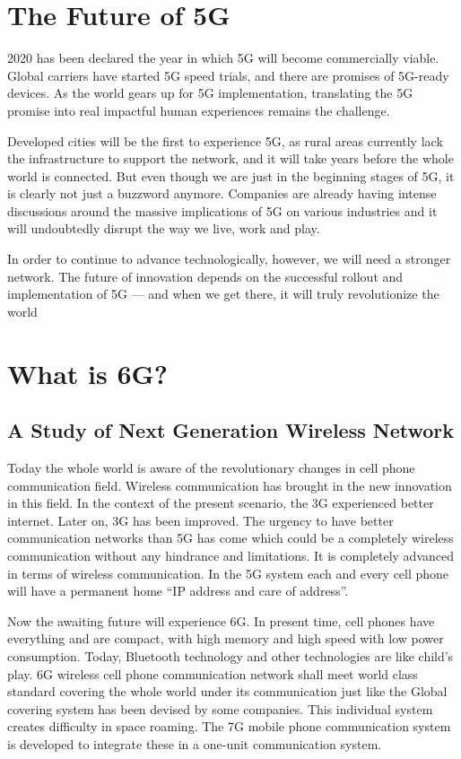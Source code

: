 \section{The Future of 5G}
2020 has been declared the year in which 5G will become commercially viable. Global carriers have started 5G speed trials, and there are promises of 5G-ready devices. As the world gears up for 5G implementation, translating the 5G promise into real impactful human experiences remains the challenge.
\item Developed cities will be the first to experience 5G, as rural areas currently lack the infrastructure to support the network, and it will take years before the whole world is connected. But even though we are just in the beginning stages of 5G, it is clearly not just a buzzword anymore. Companies are already having intense discussions around the massive implications of 5G on various industries and it will undoubtedly disrupt the way we live, work and play.\item In order to continue to advance technologically, however, we will need a stronger network. The future of innovation depends on the successful rollout and implementation of 5G — and when we get there, it will truly revolutionize the world

\section{What is 6G?}
\subsection{A Study of Next Generation Wireless Network}
Today the whole world is aware of the revolutionary changes in cell phone communication field. Wireless communication has brought in the new innovation in this field. In the context of the present scenario, the 3G experienced better internet. Later on, 3G has been improved. The urgency to have better communication networks than 5G has come which could be a completely wireless communication without any hindrance and limitations. It is completely advanced in terms of wireless communication. In the 5G system each and every cell phone will have a permanent home “IP address and care of address”.\item Now the awaiting future will experience 6G. In present time, cell phones have everything and are compact, with high memory and high speed with low power consumption. Today, Bluetooth technology and other technologies are like child’s play. 6G wireless cell phone communication network shall meet world class standard covering the whole world under its communication just like the Global covering system has been devised by some companies. This individual system creates difficulty in space roaming. The 7G mobile phone communication system is developed to integrate these in a one-unit communication system.


